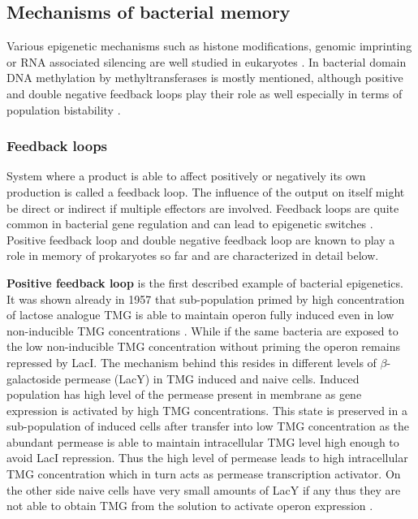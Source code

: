 \subsection{Mechanisms of bacterial memory}
Various epigenetic mechanisms such as histone modifications, genomic imprinting or RNA associated silencing are well studied in eukaryotes \cite{durso2014mechanisms}.
In bacterial domain DNA methylation by methyltransferases is mostly mentioned, although positive and double negative feedback loops play their role as well especially in terms of population bistability \cite{casadesus2006epigenetic, casadesus2013programmed, adhikari2016dna}.

\subsubsection{Feedback loops}
System where a product is able to affect positively or negatively its own production is called a feedback loop.
The influence of the output on itself might be direct or indirect if multiple effectors are involved.
Feedback loops are quite common in bacterial gene regulation and can lead to epigenetic switches \cite{smits2006phenotypic, veening2008bistability}.
Positive feedback loop and double negative feedback loop are known to play a role in memory of prokaryotes so far and are characterized in detail below.

\textbf{Positive feedback loop} is the first described example of bacterial epigenetics.
It was shown already in 1957 that  sub-population primed by high concentration of lactose analogue TMG is able to maintain  operon fully induced even in low non-inducible TMG concentrations \cite{novick1957enzyme}.
While if the same bacteria are exposed to the low non-inducible TMG concentration without priming the  operon remains repressed by LacI.
The mechanism behind this resides in different levels of $\beta$-galactoside permease (LacY) in TMG induced and naive cells.
Induced population has high level of the permease present in membrane as  gene expression is activated by high TMG concentrations.
This state is preserved in a sub-population of induced cells after transfer into low TMG concentration as the abundant permease is able to maintain intracellular TMG level high enough to avoid LacI repression.
Thus the high level of permease leads to high intracellular TMG concentration which in turn acts as permease transcription activator.
On the other side naive cells have very small amounts of LacY if any thus they are not able to obtain TMG from the solution to activate  operon expression \cite{smits2006phenotypic, casadesus2013programmed}.

